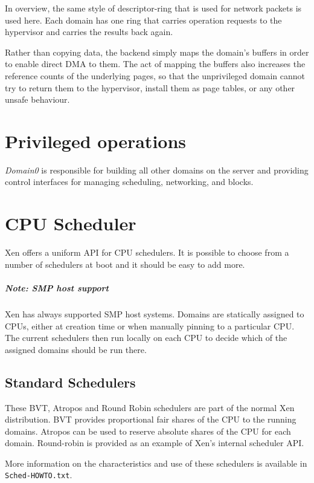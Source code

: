 \documentclass[11pt,twoside,final,openright]{xenstyle}
\begin{document}
In overview, the same style of descriptor-ring that is used for
network packets is used here.  Each domain has one ring that carries
operation requests to the hypervisor and carries the results back
again.

Rather than copying data, the backend simply maps the domain's buffers
in order to enable direct DMA to them.  The act of mapping the buffers
also increases the reference counts of the underlying pages, so that
the unprivileged domain cannot try to return them to the hypervisor,
install them as page tables, or any other unsafe behaviour.

\chapter{Privileged operations}
{\it Domain0} is responsible for building all other domains on the server
and providing control interfaces for managing scheduling, networking, and
blocks.

\chapter{CPU Scheduler}

Xen offers a uniform API for CPU schedulers.  It is possible to choose
from a number of schedulers at boot and it should be easy to add more.

\paragraph*{Note: SMP host support}
Xen has always supported SMP host systems.  Domains are statically assigned to
CPUs, either at creation time or when manually pinning to a particular CPU.
The current schedulers then run locally on each CPU to decide which of the
assigned domains should be run there.

\section{Standard Schedulers}

These BVT, Atropos and Round Robin schedulers are part of the normal
Xen distribution.  BVT provides proportional fair shares of the CPU to
the running domains.  Atropos can be used to reserve absolute shares
of the CPU for each domain.  Round-robin is provided as an example of
Xen's internal scheduler API.

More information on the characteristics and use of these schedulers is
available in {\tt Sched-HOWTO.txt}.
\end{document}
